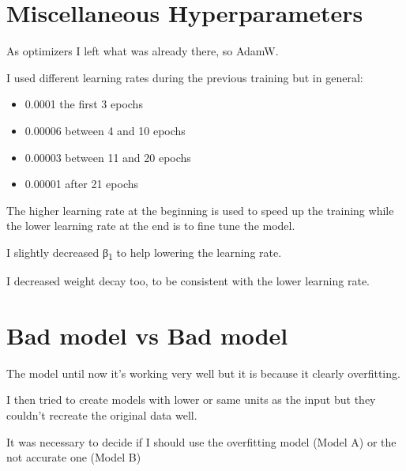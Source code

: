 \documentclass[
  letterpaper,
  DIV=11,
  numbers=noendperiod]{scrreprt}
\providecommand{\tightlist}{%
  \setlength{\itemsep}{0pt}\setlength{\parskip}{0pt}}\usepackage{longtable,booktabs,array}
\begin{document}
\hypertarget{miscellaneous-hyperparameters}{%
\chapter{Miscellaneous
Hyperparameters}\label{miscellaneous-hyperparameters}}

As optimizers I left what was already there, so AdamW.

I used different learning rates during the previous training but in
general:

\begin{itemize}
\tightlist
\item
  0.0001 the first 3 epochs
\item
  0.00006 between 4 and 10 epochs
\item
  0.00003 between 11 and 20 epochs
\item
  0.00001 after 21 epochs
\end{itemize}

The higher learning rate at the beginning is used to speed up the
training while the lower learning rate at the end is to fine tune the
model.

I slightly decreased β\textsubscript{1} to help lowering the learning
rate.

I decreased weight decay too, to be consistent with the lower learning
rate.

\hypertarget{bad-model-vs-bad-model}{%
\chapter{Bad model vs Bad model}\label{bad-model-vs-bad-model}}

The model until now it's working very well but it is because it clearly
overfitting.

I then tried to create models with lower or same units as the input but
they couldn't recreate the original data well.

It was necessary to decide if I should use the overfitting model (Model
A) or the not accurate one (Model B)
\end{document}
